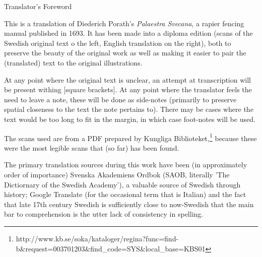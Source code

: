 {\large Translator's Foreword}

This is a translation of Diederich Porath's {\it Palaestra Svecana}, a rapier fencing manual published in 1693. It has been made into a diploma edition (scans of the Swedish original text o the left, English translation on the right), both to preserve the beauty of the original work as well as making it easier to pair the (translated) text to the original illustrations.

At any point where the original text is unclear, an attempt at transcription will be present withing [square brackets]. At any point where the translator feels the need to leave a note, these will be done as side-notes (primarily to preserve spatial closeness to the text the note pertains to).  There may be cases where the text would be too long to fit in the margin, in which case foot-notes will be used.

The scans used are from a PDF prepared by Kungliga Biblioteket,\footnote{ http://www.kb.se/soka/kataloger/regina?func=find-b\&request=003701203\&find\_code=SYS\&local\_base=KBS01} because these were the most legible scans that (so far) has been found.

The primary translation sources during this work have been (in approximately order of importance) Svenska Akademiens Ordbok (SAOB, literally 'The Dictiornary of the Swedish Academy'), a valuable source of Swedish through history; Google Translate (for the occasional term that is Italian) and the fact that late 17th century Swedish is sufficiently close to now-Swedish that the main bar to comprehension is the utter lack of consistency in spelling.